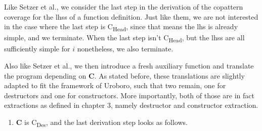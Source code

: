 \begin{algorithm}

Like Setzer et al., we consider the last step in the derivation of the copattern coverage for the lhss of a function definition. Just like them, we are not interested in the case where the last step is C\textsubscript{Head}, since that means the lhs is already simple, and we terminate. When the last step isn't C\textsubscript{Head}, but the lhss are all sufficiently simple for $i$ nonetheless, we also terminate.

\begin{prooftree}
\end{prooftree}

Also like Setzer et al., we then introduce a fresh auxiliary function and translate the program depending on \textbf{C}. As stated before, these translations are slightly adapted to fit the framework of Uroboro, such that two remain, one for destructors and one for constructors. More importantly, both of those are in fact extractions as defined in chapter 3, namely destructor and constructor extraction. 

\begin{enumerate}
\item \textbf{C} is C\textsubscript{Des}, and the last derivation step looks as follows.

\begin{prooftree}
\end{prooftree}


\end{enumerate}
\end{algorithm}
